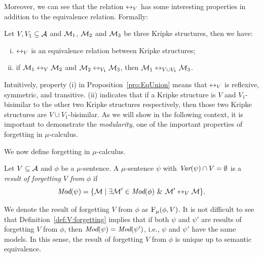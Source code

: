 \documentclass[runningheads]{llncs}
\begin{document}
Moreover, we can see that the relation $\leftrightarrow_V$ has some interesting properties in addition to the equivalence relation. Formally:

\begin{proposition} \label{pro:EqUnion}
	Let $V, V_1 \subseteq {\cal A}$ and ${\cal M}_1$, ${\cal M}_2$ and ${\cal M}_3$ be three Kripke structures, then we have:
	\begin{enumerate} [(i)]
		\item $\leftrightarrow_V$ is an equivalence relation between Kripke structures;
		\item if ${\cal M}_1 \leftrightarrow_V {\cal M}_2$ and ${\cal M}_2 \leftrightarrow_{V_1} {\cal M}_3$, then ${\cal M}_1 \leftrightarrow_{V \cup V_1} {\cal M}_3$.
	\end{enumerate}
	
\end{proposition}

Intuitively, property (i) in Proposition~\ref{pro:EqUnion} means that $\leftrightarrow_V$ is reflexive, symmetric, and transitive.
(ii) indicates that if a Kripke structure is $V$ and $V_1$-bisimilar to the other two Kripke structures respectively, then those two Kripke structures are $V \cup V_1$-bisimilar.
As we will show in the following context, it is important to demonstrate the \emph{modularity}, one of the important properties of forgetting in $\mu$-calculus.



We now define forgetting in $\mu$-calculus.

\begin{definition}[Forgetting]\label{def:V:forgetting}
	Let $V\subseteq\cal A$ and $\phi$ be a $\mu$-sentence.
	A $\mu$-sentence $\psi$ with $\textit{Var}(\psi)\cap V=\emptyset$
	is a {\em result of forgetting $V$ from} $\phi$ if
	\begin{equation*}
		\textit{Mod}(\psi)=\{{\cal M}  \mid \exists {\cal M}' \in\textit{Mod}(\phi)\ \&\ {\cal M}' \leftrightarrow_V {\cal M}\}.
	\end{equation*}
\end{definition}

We denote the result of forgetting $V$ from $\phi$ as ${\textsc{F}_{\textsc{$\mu$}}}(\phi, V)$.
It is not difficult to see that Definition~\ref{def:V:forgetting} implies that if both $\psi$ and $\psi'$ are results of forgetting $V$ from $\phi$, then
$\textit{Mod}(\psi)=\textit{Mod}(\psi')$, i.e., $\psi$ and $\psi'$ have the same models. In this sense, the result of  forgetting $V$ from $\phi$ is unique up to semantic equivalence.
\end{document}

